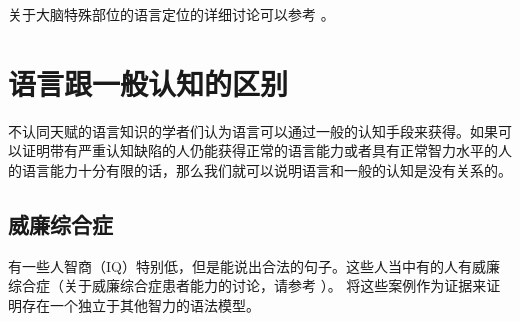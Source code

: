 关于大脑特殊部位的语言定位的详细讨论可以参考 。

\section{语言跟一般认知的区别}

不认同天赋的语言知识的学者们认为语言可以通过一般的认知手段来获得。如果可以证明带有严重认知缺陷的人仍能获得正常的语言能力或者具有正常智力水平的人的语言能力十分有限的话，那么我们就可以说明语言和一般的认知是没有关系的。

\subsection{威廉综合症}

有一些人智商（IQ）特别低，但是能说出合法的句子。这些人当中有的人有威廉综合症（关于威廉综合症患者能力的讨论，请参考 ）。 \citet{Yamada81a}将这些案例作为证据来证明存在一个独立于其他智力的语法模型。

